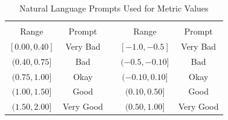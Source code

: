     \begin{table}[]
        \caption{Natural Language Prompts Used for Metric Values}
        \label{tab:word_ranges}
        \begin{tabular}{cclcc}
            \multicolumn{2}{c}{\xQ{}} & \vline & \multicolumn{2}{c}{\xO{}} \\
            Range & Prompt & \vline & Range & Prompt \\
            \hline
            $[0.00,0.40]$ & Very Bad & \vline & $[-1.0,-0.5]$ & Very Bad \\
            $(0.40,0.75]$ & Bad & \vline & $(-0.5,-0.10]$ & Bad \\
            $(0.75,1.00]$ & Okay & \vline & $(-0.10,0.10]$ & Okay \\
            $(1.00,1.50]$ & Good & \vline & $(0.10,0.50]$ & Good \\
            $(1.50,2.00]$ & Very Good & \vline & $(0.50,1.00]$ & Very Good
        \end{tabular}
    \end{table}
